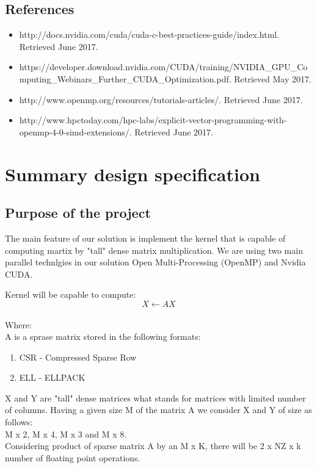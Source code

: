 \documentclass{scrreprt}
\begin{document}
\section{References}

\begin{itemize}
\item http://docs.nvidia.com/cuda/cuda-c-best-practices-guide/index.html. Retrieved June 2017.
\item https://developer.download.nvidia.com/CUDA/training/NVIDIA_GPU_Computing_Webinars_Further_CUDA_Optimization.pdf. Retrieved May 2017.
\item http://www.openmp.org/resources/tutorials-articles/. Retrieved June 2017.
\item http://www.hpctoday.com/hpc-labs/explicit-vector-programming-with-openmp-4-0-simd-extensions/. Retrieved June 2017.
\end{itemize}


\chapter{Summary design specification}

\section{Purpose of the project}
The main feature of our solution is implement the kernel that is capable of computing martix by "tall" dense matrix multiplication. We are using two main parallel technlgies in our solution Open Multi-Processing (OpenMP) and Nvidia CUDA.  

Kernel will be capable to compute:
\begin{equation} \label{eu_eqn}
X \leftarrow AX
\end{equation}
\\
Where:
\\
A is a sprase matrix stored in the following formats:
\begin{enumerate}

\item CSR - Compressed Sparse Row
\item ELL - ELLPACK
\end{enumerate}

X and Y are "tall" dense matrices what stands for matrices with limited number of columns. Having a given size M of the matrix A we consider X and Y of size as follows: \\
M x 2, M x 4, M x 3 and M x 8.
\\
Considering product of sparse matrix A by an M x K, there will be 2 x NZ x k number of floating point operations.
\end{document}
